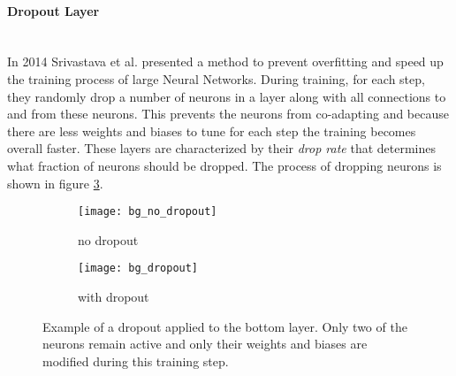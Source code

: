 \paragraph{Dropout Layer} ~\\
In 2014 Srivastava et al.\cite{Srivastava2014} presented a method to prevent overfitting and speed up the training process of large Neural Networks. During training, for each step, they randomly drop a number of neurons in a layer along with all connections to and from these neurons. This prevents the neurons from co-adapting \cite{Srivastava2014} and because there are less weights and biases to tune for each step the training becomes overall faster.
These layers are characterized by their \textit{drop rate} \label{hyp:dropout} that determines what fraction of neurons should be dropped. The process of dropping neurons is shown in figure \ref{fig:bg:dropout}.

\begin{figure}[H]
\centering
\begin{subfigure}{.5\textwidth}
    \centering
    \texttt{[image: bg\_no\_dropout]}
    \caption{no dropout}
    \label{}
\end{subfigure}%
\begin{subfigure}{.5\textwidth}
    \centering
    \texttt{[image: bg\_dropout]}
    \caption{with dropout}
    \label{}
\end{subfigure}
\caption{Example of a dropout applied to the bottom layer. Only two of the neurons remain active and only their weights and biases are modified during this training step. \cite{Srivastava2014}}
\label{fig:bg:dropout}
\end{figure}

